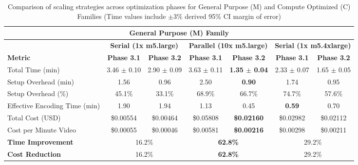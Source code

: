 \documentclass[conference]{IEEEtran}
\begin{document}
    \begin{table}[!htpb]
        \centering
        \caption{Comparison of scaling strategies across optimization phases for General Purpose (M) and Compute Optimized (C) Families (Time values include $\pm$3\% derived 95\% CI margin of error)}
        \label{tab:unified_case_study_mc}
        \begin{tabular*}{\textwidth}{l @{\extracolsep{\fill}} | cc | cc | cc}
            \toprule
            \multicolumn{7}{c}{\textbf{General Purpose (M) Family}} \\
            \midrule
            & \multicolumn{2}{c|}{\textbf{Serial (1x m5.large)}} & \multicolumn{2}{c|}{\textbf{Parallel (10x m5.large)}} & \multicolumn{2}{c}{\textbf{Serial (1x m5.4xlarge)}} \\
            \cmidrule(lr){2-3} \cmidrule(lr){4-5} \cmidrule(lr){6-7}
            \textbf{Metric} & \textbf{Phase 3.1} & \textbf{Phase 3.2} & \textbf{Phase 3.1} & \textbf{Phase 3.2} & \textbf{Phase 3.1} & \textbf{Phase 3.2} \\
            \midrule
            Total Time (min)          & 3.46 $\pm$ 0.10  & 2.90 $\pm$ 0.09  & 3.63 $\pm$ 0.11 & \textbf{1.35 $\pm$ 0.04} & 2.33 $\pm$ 0.07 & 1.65 $\pm$ 0.05 \\
            Setup Overhead (min)      & 1.56  & 0.96  & 2.50 & \textbf{0.90} & 1.74 & 0.95 \\
            Setup Overhead (\%)       & 45.1\% & 33.1\% & 68.9\% & 66.7\% & 74.7\% & 57.6\% \\
            Effective Encoding Time (min) & 1.90  & 1.94  & 1.13 & 0.45 & \textbf{0.59} & 0.70 \\
            \midrule
            Total Cost (USD)          & \$0.00554 & \$0.00464 & \$0.05808 & \textbf{\$0.02160} & \$0.02982 & \$0.02112 \\
            Cost per Minute Video     & \$0.00055 & \$0.00046 & \$0.00581 & \textbf{\$0.00216} & \$0.00298 & \$0.00211 \\
            \midrule \midrule
            \textbf{Time Improvement} & \multicolumn{2}{c|}{16.2\%} & \multicolumn{2}{c|}{\textbf{62.8\%}} & \multicolumn{2}{c}{29.2\%} \\
            \textbf{Cost Reduction}   & \multicolumn{2}{c|}{16.2\%} & \multicolumn{2}{c|}{\textbf{62.8\%}} & \multicolumn{2}{c}{29.2\%} \\
            

\end{tabular*}
\end{table}
\end{document}
